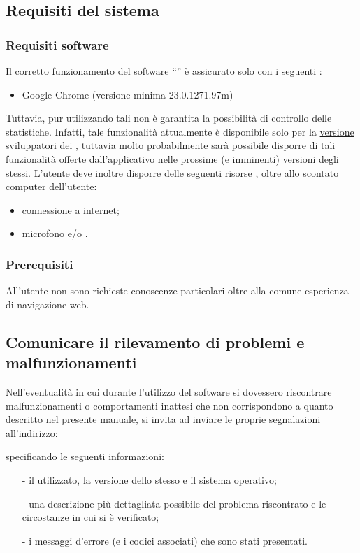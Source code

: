 \subsection{Requisiti del sistema}
\subsubsection{Requisiti software}
Il corretto funzionamento del software ``\caName'' è assicurato solo con i seguenti :
\begin{itemize}
  \item Google Chrome (versione minima 23.0.1271.97m)
\end{itemize}

Tuttavia, pur utilizzando tali  non è garantita la possibilità di controllo delle statistiche. Infatti, tale funzionalità attualmente è disponibile solo per la \underline{versione sviluppatori} dei , tuttavia molto probabilmente sarà possibile disporre di tali funzionalità offerte dall'applicativo nelle prossime (e imminenti) versioni degli stessi.
L'utente deve inoltre disporre delle seguenti risorse , oltre allo scontato computer dell'utente:
\begin{itemize}
  \item connessione a internet;
  \item microfono e/o  .
 \end{itemize}

\subsubsection{Prerequisiti}
All'utente non sono richieste conoscenze particolari oltre alla comune esperienza di navigazione web.

\subsection{Comunicare il rilevamento di problemi e malfunzionamenti}
Nell'eventualità in cui durante l'utilizzo del software \caName{} si dovessero riscontrare malfunzionamenti o comportamenti inattesi che non corrispondono a quanto descritto nel presente manuale, si invita ad inviare le proprie segnalazioni all'indirizzo:
\begin{center}
  \email{}
\end{center}
specificando le seguenti informazioni:
\begin{itemize}[noitemsep,nolistsep]
  \item[-] il  utilizzato, la versione dello stesso e il sistema operativo;
  \item[-] una descrizione più dettagliata possibile del problema riscontrato e le circostanze in cui si è verificato;
  \item[-] i messaggi d'errore (e i codici associati) che sono stati presentati.
\end{itemize}

